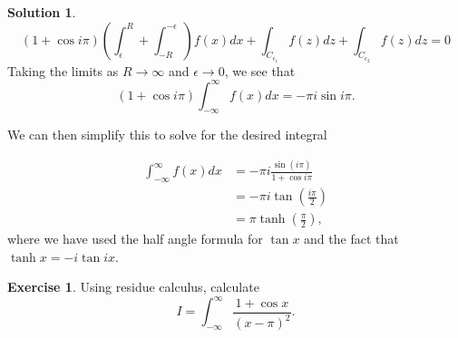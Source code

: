 \documentclass[12pt]{article}
\theoremstyle{definition}
\newtheorem{exer}{Exercise}
\newtheorem{sol}{Solution}
\theoremstyle{remark}
\begin{document}
\begin{sol}
\begin{equation}
    (1+\cos i\pi)    \left( \int_{\epsilon}^{R} + \int_{-R }^{-\epsilon} \right) f(x)dx + \int_{C_{\epsilon_1}}f(z)dz +    \int_{C_{\epsilon_2}}f(z)dz = 0
\end{equation}
Taking the limits as $R\to\infty$ and $\epsilon\to 0$, we see that 
\begin{equation}
    (1+\cos i\pi) \int_{-\infty}^{\infty}f(x)dx = -\pi i \sin i\pi.
\end{equation}

We can then simplify this to solve for the desired integral

\begin{align}
    \int_{-\infty}^{\infty}f(x)dx &=  -\pi i \frac{\sin(i\pi)}{1+\cos i\pi}\\
                                  &= -\pi i \tan\left( \frac{i\pi}{2}  \right)\\
                                  &= \pi \tanh\left( \frac{\pi}{2}  \right),
\end{align}
where we have used the half angle formula for $\tan x$ and the fact that $\tanh x = -i \tan i x$.
\end{sol}

\newpage

\begin{exer}
    Using residue calculus, calculate
    \begin{equation}
        I = \int_{-\infty}^{\infty} \frac{1 + \cos x}{(x-\pi)^2}. 
    \end{equation}
\end{exer}
\end{document}
